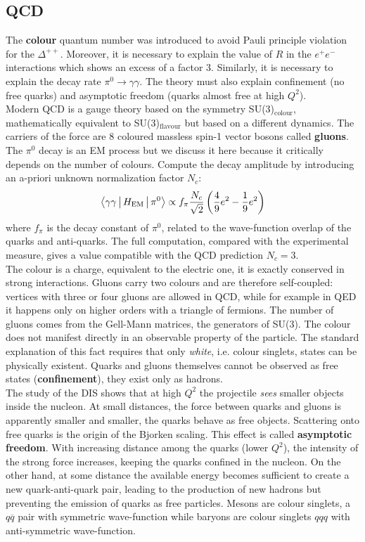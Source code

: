 \documentclass[10.75pt,a4paper,openright,bottom=2cm]{article}
\begin{document}
\subsection{QCD}
The \textbf{colour} quantum number was introduced to avoid Pauli principle violation for the $\Delta^{++}$. Moreover, it is necessary to explain the value of $R$ in the $e^+e^-$ interactions which shows an excess of a factor 3. Similarly, it is necessary to explain the decay rate $\pi^0\to\gamma\gamma$. The theory must also explain confinement (no free quarks) and asymptotic freedom (quarks almost free at high $Q^2$).\\
Modern QCD is a gauge theory based on the symmetry SU(3)$_{\text{colour}}$, mathematically equivalent to SU(3)$_{\text{flavour}}$ but based on a different dynamics. The carriers of the force are 8 coloured massless spin-1 vector bosons called \textbf{gluons}.\\
The $\pi^0$ decay is an EM process but we discuss it here because it critically depends on the number of colours. Compute the decay amplitude by introducing an a-priori unknown normalization factor $N_c$:
\[
\Braket{\gamma\gamma|H_{\text{EM}}|\pi^0}\propto f_\pi\frac{N_c}{\sqrt{2}}\left(\frac{4}{9}e^2-\frac{1}{9}e^2\right)
\]
where $f_\pi$ is the decay constant of $\pi^0$, related to the wave-function overlap of the quarks and anti-quarks. The full computation, compared with the experimental measure, gives a value compatible with the QCD prediction $N_c=3$.\\
The colour is a charge, equivalent to the electric one, it is exactly conserved in strong interactions. Gluons carry two colours and are therefore self-coupled: vertices with three or four gluons are allowed in QCD, while for example in QED it happens only on higher orders with a triangle of fermions. The number of gluons comes from the Gell-Mann matrices, the generators of SU(3). The colour does not manifest directly in an observable property of the particle. The standard explanation of this fact requires that only \textit{white}, i.e. colour singlets, states can be physically existent. Quarks and gluons themselves cannot be observed as free states (\textbf{confinement}), they exist only as hadrons.\\
The study of the DIS shows that at high $Q^2$ the projectile \textit{sees} smaller objects inside the nucleon. At small distances, the force between quarks and gluons is apparently smaller and smaller, the quarks behave as free objects. Scattering onto free quarks is the origin of the Bjorken scaling. This effect is called \textbf{asymptotic freedom}. With increasing distance among the quarks (lower $Q^2$), the intensity of the strong force increases, keeping the quarks confined in the nucleon. On the other hand, at some distance the available energy becomes sufficient to create a new quark-anti-quark pair, leading to the production of new hadrons but preventing the emission of quarks as free particles. Mesons are colour singlets, a $q\overline{q}$ pair with symmetric wave-function while baryons are colour singlets $qqq$ with anti-symmetric wave-function.\\
\end{document}
